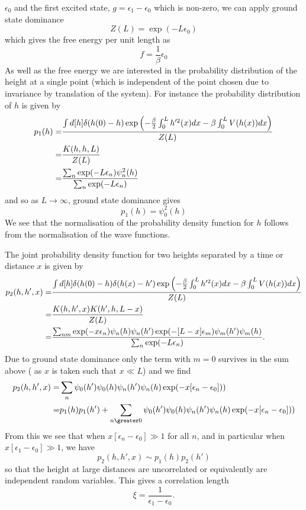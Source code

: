 $\epsilon_0$ and the first excited state, $g=\epsilon_1-\epsilon_0$ which is non-zero, we can apply ground state dominance 
\begin{equation}
    Z(L) =\exp(-L\epsilon_0)
\end{equation}
which gives the free energy per unit length as
\begin{equation}
    f=\frac{1}{\beta}\epsilon_0
\end{equation}
As well as the free energy we are interested in the probability distribution of the height at a single point (which is independent of the point chosen due to invariance by translation of the system). For instance the probability distribution of $h$ is given by
\begin{align}
p_1(h)=& \frac{\int d[h]\delta(h(0)-h)\exp\left(-\frac{\beta}{2}\int_0^L h'^2(x) dx -\beta\int_0^L  V(h(x)) dx\right)}{Z(L)}\nonumber \\
=& \frac{K(h,h,L)}{Z(L)} \nonumber \\
=& \frac{\sum_n \exp(-L\epsilon_n)\psi_n^2(h)}{\sum_n \exp(-L\epsilon_n)}
\end{align}
and so as $L\to\infty$, ground state dominance gives
\begin{equation}
    p_1(h)= \psi_0^2(h)
\end{equation}
We see that the normalisation of the probability density function for $h$ follows from the 
normalisation of the wave functions.

The joint probability density function for two heights separated by a time or distance $x$ is given by
\begin{align}
p_2(h,h',x)=& \frac{\int d[h]\delta(h(0)-h)\delta(h(x)-h')\exp\left(-\frac{\beta}{2}\int_0^L h'^2(x) dx -\beta\int_0^L  V(h(x)) dx\right)}{Z(L)}\nonumber \\
=& \frac{K(h,h',x)K(h',h,L-x)}{Z(L)} \nonumber \\
=& \frac{\sum_{nm} \exp(-x\epsilon_n)\psi_n(h)\psi_n(h')\exp(-[L-x]\epsilon_m)\psi_m(h')\psi_m(h)}{\sum_n \exp(-L\epsilon_n)}.
\end{align}
Due to ground state dominance only the term with $m=0$ survives in the sum above (
as $x$ is taken such that $x\ll L$) and we find
\begin{align}
p_2(h,h',x) =& \sum_{n} \psi_0(h')\psi_0(h)\psi_n(h')\psi_n(h)\exp(-x[\epsilon_n-\epsilon_0]))\nn
=& p_1(h)p_1(h') + \sum_{n\greater0} \psi_0(h')\psi_0(h)\psi_n(h')\psi_n(h)\exp(-x[\epsilon_n-\epsilon_0]))
\end{align}
From this we see that when $x[\epsilon_n-\epsilon_0] \gg1 $ for all $n$, and in particular when $x[\epsilon_1-\epsilon_0] \gg1$, we have 
\begin{equation}
    p_2(h,h',x) \sim p_1(h)p_2(h')
\end{equation}
so that the height at large distances are uncorrelated or equivalently are independent random variables. This gives a correlation length
\begin{equation}
    \xi = \frac{1}{\epsilon_1-\epsilon_0}.\label{clq}
\end{equation}

